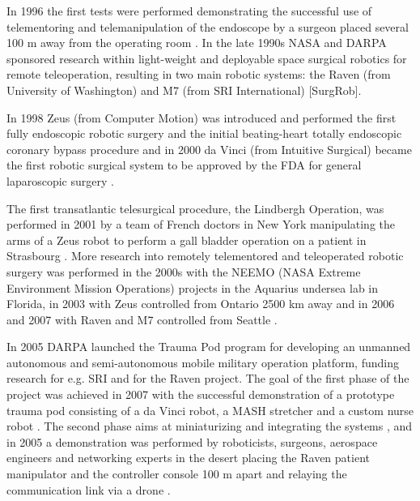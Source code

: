 In 1996 the first tests were performed demonstrating the successful use of telementoring and telemanipulation of the endoscope by a surgeon placed several 100 m away from the operating room \citep{bib:telesurg_history}. 
In the late 1990s NASA and DARPA sponsored research within light-weight and deployable space surgical robotics for remote teleoperation, resulting in two main robotic systems: the Raven (from University of Washington) and M7 (from SRI International) [SurgRob].

In 1998 Zeus (from Computer Motion) was introduced and performed the first fully endoscopic robotic surgery and the initial beating-heart totally endoscopic coronary bypass procedure \citep{bib:brown_univ} and in 2000 da Vinci (from Intuitive Surgical) became the first robotic surgical system  to be approved by the FDA for general laparoscopic surgery \citep{bib:mddi}.

The first transatlantic telesurgical procedure, the Lindbergh Operation, was performed in 2001 by a team of French doctors in New York manipulating the arms of a Zeus robot to perform a gall bladder operation on a patient in Strasbourg \citep{bib:telesurg_history}. More research into remotely telementored and teleoperated robotic surgery was performed in the 2000s with the NEEMO (NASA Extreme Environment Mission Operations) projects in the Aquarius undersea lab in Florida, in 2003 with Zeus controlled from Ontario 2500 km away \citep[pp 75, 81]{bib:surgical_book} and in 2006 and 2007 with Raven and M7 controlled from Seattle \citep[pp 28, 82]{bib:surgical_book}. 

In 2005 DARPA launched the Trauma Pod program for developing an unmanned autonomous and semi-autonomous mobile military operation platform, funding research for e.g. SRI and for the Raven project. The goal of the first phase of the project was achieved in 2007 with the successful demonstration of a prototype trauma pod consisting of a da Vinci robot, a MASH stretcher and a custom nurse robot \citep[p 30]{bib:surgical_book}. The second phase aims at miniaturizing and integrating the systems \citep[p 31]{bib:surgical_book}, and in 2005 a demonstration was performed by roboticists, surgeons, aerospace engineers and networking experts in the desert placing the Raven patient manipulator and the controller console 100 m apart and relaying the communication link via a drone \citep{bib:docatadist}.

%
%

